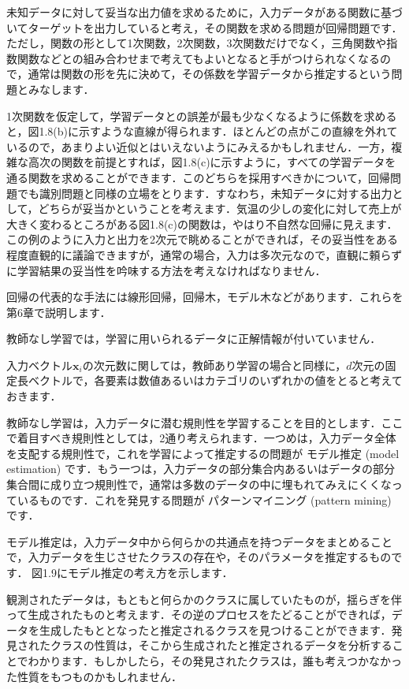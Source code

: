 未知データに対して妥当な出力値を求めるために，入力データがある関数に基づいてターゲットを出力していると考え，その関数を求める問題が回帰問題です．ただし，関数の形として1次関数，2次関数，3次関数だけでなく，三角関数や指数関数などとの組み合わせまで考えてもよいとなると手がつけられなくなるので，通常は関数の形を先に決めて，その係数を学習データから推定するという問題とみなします．

1次関数を仮定して，学習データとの誤差が最も少なくなるように係数を求めると，図1.8(b)に示すような直線が得られます．ほとんどの点がこの直線を外れているので，あまりよい近似とはいえないようにみえるかもしれません．一方，複雑な高次の関数を前提とすれば，図1.8(c)に示すように，すべての学習データを通る関数を求めることができます．このどちらを採用すべきかについて，回帰問題でも識別問題と同様の立場をとります．すなわち，未知データに対する出力として，どちらが妥当かということを考えます．気温の少しの変化に対して売上が大きく変わるところがある図1.8(c)の関数は，やはり不自然な回帰に見えます．この例のように入力と出力を2次元で眺めることができれば，その妥当性をある程度直観的に議論できますが，通常の場合，入力は多次元なので，直観に頼らずに学習結果の妥当性を吟味する方法を考えなければなりません．

回帰の代表的な手法には線形回帰，回帰木，モデル木などがあります．これらを第6章で説明します．


教師なし学習では，学習に用いられるデータに正解情報が付いていません．

入力ベクトル$\bm{x}_i$の次元数に関しては，教師あり学習の場合と同様に，$d$次元の固定長ベクトルで，各要素は数値あるいはカテゴリのいずれかの値をとると考えておきます．

教師なし学習は，入力データに潜む規則性を学習することを目的とします．ここで着目すべき規則性としては，2通り考えられます．一つめは，入力データ全体を支配する規則性で，これを学習によって推定するの問題が
モデル推定 (model estimation)
です．もう一つは，入力データの部分集合内あるいはデータの部分集合間に成り立つ規則性で，通常は多数のデータの中に埋もれてみえにくくなっているものです．これを発見する問題が
パターンマイニング (pattern mining) 
です．


モデル推定は，入力データ中から何らかの共通点を持つデータをまとめることで，入力データを生じさせたクラスの存在や，そのパラメータを推定するものです．
図1.9にモデル推定の考え方を示します．

観測されたデータは，もともと何らかのクラスに属していたものが，揺らぎを伴って生成されたものと考えます．その逆のプロセスをたどることができれば，データを生成したもととなったと推定されるクラスを見つけることができます．発見されたクラスの性質は，そこから生成されたと推定されるデータを分析することでわかります．もしかしたら，その発見されたクラスは，誰も考えつかなかった性質をもつものかもしれません．

